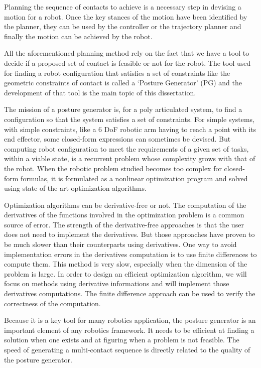 Planning the sequence of contacts to achieve is a necessary step in devising a motion for a robot.
Once the key stances of the motion have been identified by the planner, they can be used by the controller or the trajectory planner and finally the motion can be achieved by the robot.

All the aforementioned planning method rely on the fact that we have a tool to decide if a proposed set of contact is feasible or not for the robot.
The tool used for finding a robot configuration that satisfies a set of constraints like the geometric constraints of contact is called a `Posture Generator' (PG) and the development of that tool is the main topic of this dissertation.

The mission of a posture generator is, for a poly articulated system, to find a configuration so that the system satisfies a set of constraints.
For simple systems, with simple constraints, like a 6 DoF robotic arm having to reach a point with its end effector, some closed-form expressions can sometimes be devised.
But computing robot configuration to meet the requirements of a given set of tasks, within a viable state, is a recurrent problem whose complexity grows with that of the robot.
When the robotic problem studied becomes too complex for closed-form formulas, it is formulated as a nonlinear optimization program and solved using state of the art optimization algorithms.

Optimization algorithms can be derivative-free or not.
The computation of the derivatives of the functions involved in the optimization problem is a common source of error.
The strength of the derivative-free approaches is that the user does not need to implement the derivatives.
But those approaches have proven to be much slower than their counterparts using derivatives.
One way to avoid implementation errors in the derivatives computation is to use finite differences to compute them.
This method is very slow, especially when the dimension of the problem is large.
In order to design an efficient optimization algorithm, we will focus on methods using derivative informations and will implement those derivatives computations.
The finite difference approach can be used to verify the correctness of the computation.

Because it is a key tool for many robotics application, the posture generator is an important element of any robotics framework.
It needs to be efficient at finding a solution when one exists and at figuring when a problem is not feasible.
The speed of generating a multi-contact sequence is directly related to the quality of the posture generator.

